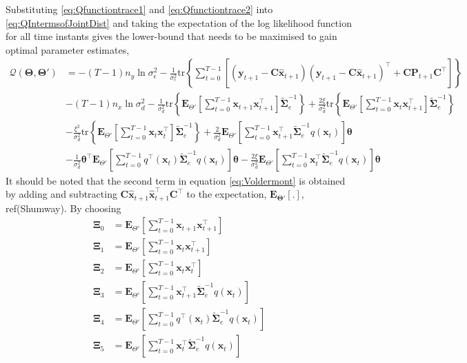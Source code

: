 \documentclass[]{article}
\begin{document}
Substituting  \ref{eq:Qfunctiontrace1} and \ref{eq:Qfunctiontrace2} into \ref{eq:QIntermsofJointDist} and taking the expectation of the log likelihood function for all time instants gives the lower-bound that needs to be maximised to gain optimal parameter estimates,
\begin{align}\label{eq:Voldermont}
 \mathcal Q(\boldsymbol \Theta,\boldsymbol\Theta')&= -(T-1)n_y\ln \sigma_{\epsilon}^2-\frac{1}{\sigma_{\epsilon}^2}\mathrm{tr}\left\lbrace\boldsymbol\sum_{t=0}^{T-1}\left[ (\mathbf y_{t+1}-\mathbf C\mathbf{\hat{x}}_{t+1}) (\mathbf y_{t+1}-\mathbf C\mathbf{\hat{x}}_{t+1})^\top+\mathbf C \mathbf P_{t+1}\mathbf C^\top\right] \right\rbrace\nonumber \\
&-(T-1)n_x\ln\sigma_d^2-\frac{1}{\sigma_d^2}\mathrm{tr}\left\lbrace \mathbf E_{\Theta'}\left[\sum_{t=0}^{T-1}\mathbf x_{t+1}\mathbf x_{t+1}^\top\right]\tilde{\boldsymbol\Sigma}_e^{-1}\right\rbrace +\frac{2\xi}{\sigma_d^2} \mathrm{tr}\left\lbrace \mathbf E_{\Theta'}\left[\sum_{t=0}^{T-1}\mathbf x_t\mathbf x_{t+1}^\top\right] \tilde{\boldsymbol\Sigma}_e^{-1}\right\rbrace \nonumber \\
&-\frac{\xi^2}{\sigma_d^2}\mathrm{tr} \left\lbrace\mathbf E_{\Theta'}\left[\sum_{t=0}^{T-1}\mathbf x_t\mathbf x_{t}^\top\right]\tilde{\boldsymbol\Sigma}_e^{-1} \right\rbrace +\frac{2}{\sigma_d^2}\mathbf E_{\Theta'}\left[\sum_{t=0}^{T-1}\mathbf x_{t+1}^\top\tilde{\boldsymbol\Sigma}_e^{-1}q( \mathbf x_t)\right]\boldsymbol\theta
 \nonumber \\
&-\frac{1}{\sigma_d^2}\boldsymbol\theta^\top \mathbf E_{\Theta'}\left[\sum_{t=0}^{T-1}  q^\top(\mathbf  x_t)\tilde{\boldsymbol\Sigma}_e^{-1}q(\mathbf x_t)\right]\boldsymbol\theta-\frac{2\xi}{\sigma_d^2} \mathbf E_{\Theta'}\left[\sum_{t=0}^{T-1} \mathbf x_t^\top\tilde{\boldsymbol\Sigma}_e^{-1}q(\mathbf x_t)  \right] \boldsymbol\theta
\end{align}
It should be noted that the second term in equation \ref{eq:Voldermont} is obtained by adding and subtracting $\mathbf C \mathbf{\hat{x}}_{t+1} \mathbf{\hat{x}}_{t+1}^\top \mathbf C^\top$ to the expectation, $\mathbf E_{\boldsymbol\Theta'}\left[ .\right]$, ref(Shumway). By choosing
\begin{align}
	\boldsymbol\Xi_{0}&=\mathbf E_{\Theta'}\left[\sum_{t=0}^{T-1}\mathbf x_{t+1}\mathbf x_{t+1}^\top\right]\label{eq:defofXi0} \\
\boldsymbol\Xi_{1}&=\mathbf E_{\Theta'}\left[\sum_{t=0}^{T-1}\mathbf x_t\mathbf x_{t+1}^\top\right]\label{eq:defofXi1} \\
\boldsymbol\Xi_{2}&=\mathbf E_{\Theta'}\left[\sum_{t=0}^{T-1}\mathbf x_t\mathbf x_{t}^\top\right]\\
\boldsymbol\Xi_{3}&=\mathbf E_{\Theta'}\left[\sum_{t=0}^{T-1}\mathbf x_{t+1}^\top\tilde{\boldsymbol\Sigma}_e^{-1}q( \mathbf x_t)\right] \label{eq:Xi3} \\	
\boldsymbol\Xi_{4}&= \mathbf E_{\Theta'}\left[\sum_{t=0}^{T-1}  q^\top(\mathbf  x_t)\tilde{\boldsymbol\Sigma}_e^{-1}q(\mathbf x_t)\right] \label{eq:Xi4}\\
 \boldsymbol\Xi_{5}&=\mathbf E_{\Theta'}\left[\sum_{t=0}^{T-1} \mathbf x_t^\top\tilde{\boldsymbol\Sigma}_e^{-1}q(\mathbf x_t)  \right] \label{eq:Xi5}
 \end{align}
\end{document}

